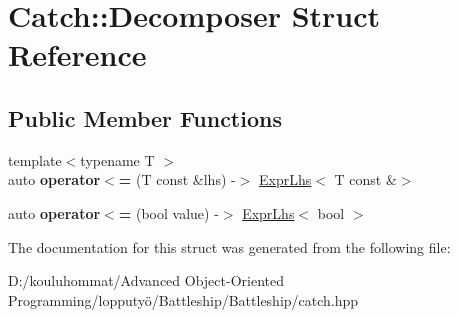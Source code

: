 \hypertarget{struct_catch_1_1_decomposer}{}\section{Catch\+:\+:Decomposer Struct Reference}
\label{struct_catch_1_1_decomposer}
\subsection*{Public Member Functions}
\begin{DoxyCompactItemize}
\item 
\mbox{\label{struct_catch_1_1_decomposer_a20b5b8c0e2ff0328a019ae1a8deca03a}} 
{\footnotesize template$<$typename T $>$ }\\auto {\bfseries operator$<$=} (T const \&lhs) -\/$>$ \mbox{\hyperlink{class_catch_1_1_expr_lhs}{Expr\+Lhs}}$<$ T const \&$>$
\item 
\mbox{\label{struct_catch_1_1_decomposer_aac129b94903ae1339d5709049d83613b}} 
auto {\bfseries operator$<$=} (bool value) -\/$>$ \mbox{\hyperlink{class_catch_1_1_expr_lhs}{Expr\+Lhs}}$<$ bool $>$
\end{DoxyCompactItemize}


The documentation for this struct was generated from the following file\+:\begin{DoxyCompactItemize}
\item 
D\+:/kouluhommat/\+Advanced Object-\/\+Oriented Programming/lopputyö/\+Battleship/\+Battleship/catch.\+hpp\end{DoxyCompactItemize}
